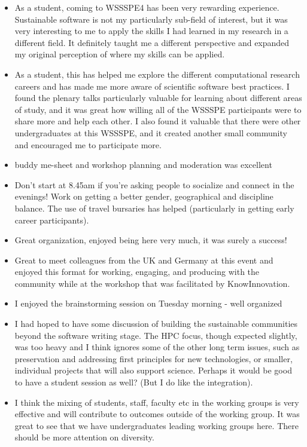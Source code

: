 \begin{itemize}
\item As a student, coming to WSSSPE4 has been very rewarding experience. Sustainable software is not my particularly sub-field of interest, but it was very interesting to me to apply the skills I had learned in my research in a different field. It definitely taught me a different perspective and expanded my original perception of where my skills can be applied.
\item As a student, this has helped me explore the different computational research careers and has made me more aware of scientific software best practices.  I found the plenary talks particularly valuable for learning about different areas of study, and it was great how willing all of the WSSSPE participants were to share more and help each other. I also found it valuable that there were other undergraduates at this WSSSPE, and it created another small community and encouraged me to participate more.
\item buddy me-sheet and workshop planning and moderation was excellent
\item Don't start at 8.45am if you're asking people to socialize and connect in the evenings! Work on getting a better gender, geographical and discipline balance. The use of travel bursaries has helped (particularly in getting early career participants).
\item Great organization, enjoyed being here very much, it was surely a success!
\item Great to meet colleagues from the UK and Germany at this event and enjoyed this format for working, engaging, and producing with the community while at the workshop that was facilitated by KnowInnovation.
\item I enjoyed the brainstorming session on Tuesday morning - well organized
\item I had hoped to have some discussion of building the sustainable communities beyond the software writing stage. The HPC focus, though expected slightly, was too heavy and I think ignores some of the other long term issues, such as preservation and addressing first principles for new technologies, or smaller, individual projects that will also support science. Perhaps it would be good to have a student session as well? (But I do like the integration).
\item I think the mixing of students, staff, faculty etc in the working groups is very effective and will contribute to  outcomes outside of the working group. It was great to see that we have undergraduates leading working groups here. There should be more attention on diversity.

\end{itemize}
